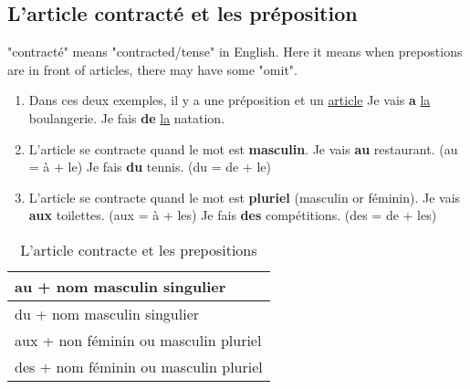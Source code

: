 \documentclass[10pt,a4paper,twoside]{article} %
\begin{document}
\subsection*{L'article contracté et les préposition}
\begin{center}
    "contracté" means "contracted/tense" in English. Here it means when prepostions are in front of articles, there may have some "omit".
\end{center}
\begin{enumerate}
    \item Dans ces deux exemples, il y a une préposition et un \underline{article} \newline
    Je vais \textbf{a} \underline{la} boulangerie. \newline
    Je fais \textbf{de} \underline{la} natation.
    \item L'article se contracte quand le mot est \textbf{masculin}. \newline
    Je vais \textbf{au} restaurant. (au = à + le) \newline
    Je fais \textbf{du} tennis. (du = de + le)
    \item L'article se contracte quand le mot est \textbf{pluriel} (masculin or féminin). \newline
    Je vais \textbf{aux} toilettes. (aux = à + les) \newline
    Je fais \textbf{des} compétitions. (des = de + les)
\end{enumerate}

\begin{table}[h]
\centering
\begin{tabular}{|l|}
\hline
\multicolumn{1}{|l|}{au + nom masculin singulier} \\ \hline
du + nom masculin singulier                       \\ \hline
aux + non féminin ou masculin pluriel             \\ \hline
des + nom féminin ou masculin pluriel             \\ \hline
\end{tabular}
\caption{L'article contracte et les prepositions}
\label{tab:Larticle-contracte-et-les-prepositions}
\end{table}
\end{document}
